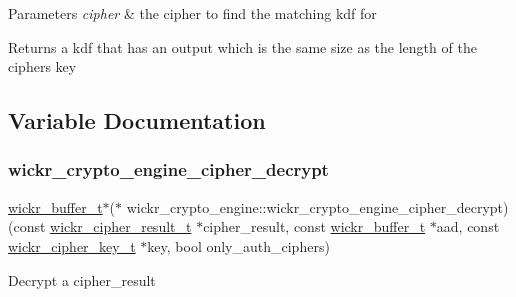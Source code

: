 \begin{DoxyParams}{Parameters}
{\em cipher} & the cipher to find the matching kdf for \\
\hline
\end{DoxyParams}
\begin{DoxyReturn}{Returns}
a kdf that has an output which is the same size as the length of the cipher\textquotesingle{}s key 
\end{DoxyReturn}


\subsection{Variable Documentation}
\mbox{\label{group__wickr__crypto__engine_ga459ef821cc40edb5e3c9ce1d571ddc00}} 
\subsubsection{\texorpdfstring{wickr\+\_\+crypto\+\_\+engine\+\_\+cipher\+\_\+decrypt}{wickr\_crypto\_engine\_cipher\_decrypt}}
{\footnotesize\ttfamily \mbox{\hyperlink{structwickr__buffer}{wickr\+\_\+buffer\+\_\+t}}$\ast$($\ast$ wickr\+\_\+crypto\+\_\+engine\+::wickr\+\_\+crypto\+\_\+engine\+\_\+cipher\+\_\+decrypt) (const \mbox{\hyperlink{structwickr__cipher__result}{wickr\+\_\+cipher\+\_\+result\+\_\+t}} $\ast$cipher\+\_\+result, const \mbox{\hyperlink{structwickr__buffer}{wickr\+\_\+buffer\+\_\+t}} $\ast$aad, const \mbox{\hyperlink{structwickr__cipher__key}{wickr\+\_\+cipher\+\_\+key\+\_\+t}} $\ast$key, bool only\+\_\+auth\+\_\+ciphers)}

Decrypt a cipher\+\_\+result


